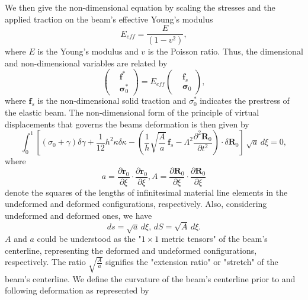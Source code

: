 \documentclass[12pt,MSc,twoside]{muthesis_2020}
\begin{document}
We then give the non-dimensional equation by scaling the stresses and the applied traction on the beam's effective Young's modulus
\begin{equation}
	\label{eqn:29}
E_{eff}=\frac{E}{(1-v^2)},
\end{equation}
where $E$ is the Young's modulus and $v$ is the Poisson ratio. Thus, the dimensional and non-dimensional variables are related by 
\begin{equation}
	\label{eqn:30}
		\left(\begin{aligned}
		&\mathbf{f^*} \\
		&\mathbf{\sigma}_0^*
	\end{aligned}\right)
 =E_{eff}\left(\begin{aligned}
	&\textbf{f}_{s} \\
	&\mathbf{\sigma}_0
\end{aligned}\right),
\end{equation}
where $\textbf{f}_{s}$ is the non-dimensional solid traction and $\sigma^*_0$ indicates the prestress of the elastic beam.
The non-dimensional form of the principle of virtual displacements that governs the beams deformation is then given by
\begin{equation}
	\label{eqn:31}
	\int^1_0 \left[(\sigma_0+\gamma)\delta\gamma+\frac{1}{12}h^2\kappa\delta\kappa-\left(\frac{1}{h}\sqrt{\frac{A}{a}}\,\textbf{f}_{s}-\Lambda^2\frac{\partial^2\textbf{R}_0}{\partial t^2}
	\right)\cdot \delta \textbf{R}_0
	\right]\,\sqrt{a}\,d\xi=0,
\end{equation}
where 
\begin{equation}
	\label{eqn:32} a=\frac{\partial\textbf{r}_0}{\partial\xi}\cdot\frac{\partial\textbf{r}_0}{\partial\xi}, A=\frac{\partial\textbf{R}_0}{\partial\xi}\cdot\frac{\partial\textbf{R}_0}{\partial\xi}
\end{equation}
 denote the squares of the lengths of infinitesimal material line elements in the undeformed and deformed configurations, respectively.
Also, considering undeformed and deformed ones, we have 
\begin{equation}
	\label{eqn:33}
ds=\sqrt{a}\,d\xi,\,dS=\sqrt{A}\,d\xi.
\end{equation}
$A$ and $a$ could be understood as the "$1\times1$ metric tensors" of the beam's centerline, representing the deformed and undeformed configurations, respectively. 
The ratio $\sqrt{\frac{A}{a}}$ signifies the "extension ratio" or "stretch" of the beam's centerline. We define the curvature of the beam's centerline prior to and following deformation as represented by 
\end{document}
